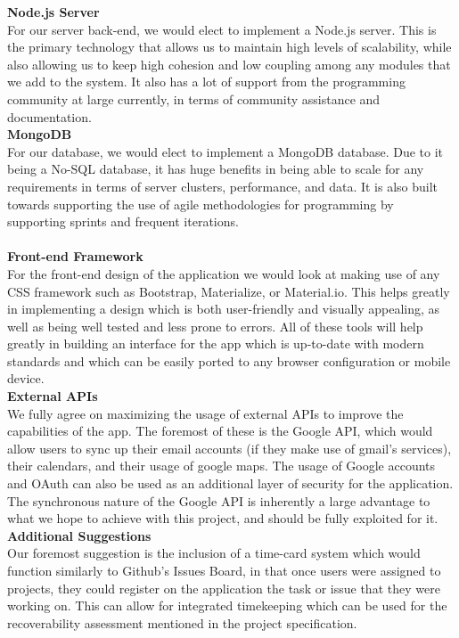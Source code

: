 \documentclass[12pt]{article}
\begin{document}
	\textbf{Node.js Server}\\
	For our server back-end, we would elect to implement a Node.js server. This is the primary technology that allows us to maintain high levels of scalability, while also allowing us to keep high cohesion and low coupling among any modules that we add to the system. It also has a lot of support from the programming community at large currently, in terms of community assistance and documentation. \\
	
	\textbf{MongoDB}\\
	For our database, we would elect to implement a MongoDB database. Due to it being a No-SQL database, it has huge benefits in being able to scale for any requirements in terms of server clusters, performance, and data. It is also built towards supporting the use of agile methodologies for programming by supporting sprints and frequent iterations.\\
	
	\newpage\\
	\textbf{Front-end Framework}\\
	For the front-end design of the application we would look at making use of any CSS framework such as Bootstrap, Materialize, or Material.io. This helps greatly in implementing a design which is both user-friendly and visually appealing, as well as being well tested and less prone to errors. All of these tools will help greatly in building an interface for the app which is up-to-date with modern standards and which can be easily ported to any browser configuration or mobile device.\\
	
	\textbf{External APIs}\\
	We fully agree on maximizing the usage of external APIs to improve the capabilities of the app. The foremost of these is the Google API, which would allow users to sync up their email accounts (if they make use of gmail's services), their calendars, and their usage of google maps. The usage of Google accounts and OAuth can also be used as an additional layer of security for the application. The synchronous nature of the Google API is inherently a large advantage to what we hope to achieve with this project, and should be fully exploited for it.\\
	
	\textbf{Additional Suggestions}\\
	Our foremost suggestion is the inclusion of a time-card system which would function similarly to Github's Issues Board, in that once users were assigned to projects, they could register on the application the task or issue that they were working on. This can allow for integrated timekeeping which can be used for the recoverability assessment mentioned in the project specification.\\
\end{document}
